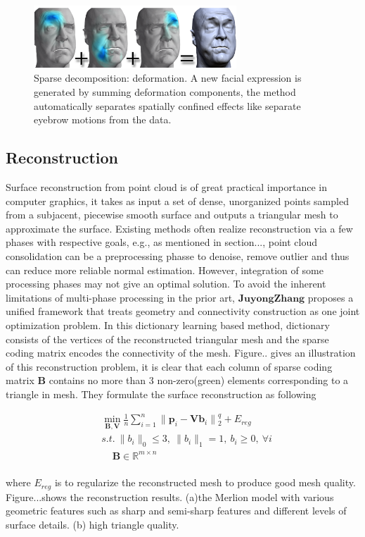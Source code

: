 \begin{figure}[ht]
  \centering
  \includegraphics[width=3in]{images/localdefor_learning}
  \caption{Sparse decomposition: deformation\cite{neumann2013sparse}. A new facial expression is generated by summing deformation components, the method automatically separates spatially confined effects like separate eyebrow motions from the data.}
\end{figure}



\subsection{Reconstruction}
Surface reconstruction from point cloud is of great practical importance in computer graphics, it takes as input a set of dense, unorganized points sampled from a subjacent, piecewise smooth surface and outputs a triangular mesh to approximate the surface. Existing methods often realize reconstruction via a few phases with respective goals, e.g., as mentioned in section..., point cloud consolidation can be a preprocessing phasse to denoise, remove outlier and thus can reduce more reliable normal estimation. However, integration of some processing phases may not give an optimal solution. To avoid the inherent limitations of multi-phase processing in the prior art, $\mathbf{Juyong Zhang}$ proposes a unified framework that treats geometry and connectivity construction as one joint optimization problem. In this dictionary learning based method, dictionary consists of the vertices of the reconstructed triangular mesh and the sparse coding matrix encodes the connectivity of the mesh. Figure.. gives an illustration of this reconstruction problem, it is clear that each column of sparse coding matrix $\mathbf{B}$ contains no more than 3 non-zero(green) elements corresponding to a triangle in mesh. They formulate the surface reconstruction as following

\small{
\begin{equation}
 \label{eq:dictreconstruction}
 \begin{split}
 & \min_{\mathbf{B},\mathbf{V}}\frac{1}{n}\sum_{i=1}^{n}\|\mathbf{p}_{i}-\mathbf{Vb}_{i}\|{_2^{q}}+E_{reg}\\
 & s.t.~\|b_{i}\|_0\le3,~\|b_{i}\|_1=1,~b_{i}\ge0,~\forall i \\
 & ~~~~~\mathbf{B}\in \mathbb{R}^{m\times n}
 \end{split}
\end{equation}
}
\\
where $E_{reg}$ is to regularize the reconstructed mesh to produce good mesh quality. Figure...shows the reconstruction results. (a)the Merlion model with various geometric features such as sharp and semi-sharp features and different levels of surface details. (b) high triangle quality.


